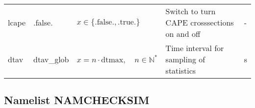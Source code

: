\documentclass[twoside,11pt,fleqn,a4paper,english,openright]{report}
\begin{document}
\begin{center}
  \tablelasttail{
        &&&&\\\hline
  }
\begin{supertabular}{|l|p{1.6cm}|p{4cm}|p{6cm}|l|}
  lcape	& .false.	& $x\in\{\text{.false.},\text{.true.}\}$	& Switch to turn CAPE crosssections on and off & -\\
  dtav		& dtav\_glob	& $x = n \cdot \text{dtmax}, \quad n \in \mathbb{N}^*$	& Time interval for sampling of statistics	& s\\
\end{supertabular}
\end{center}

\newpage
\subsection{Namelist NAMCHECKSIM}\label{par:checksim}
\end{document}
